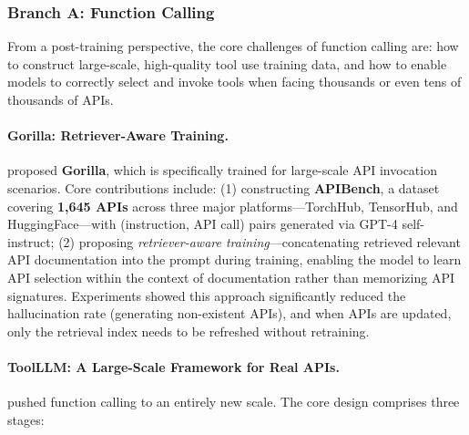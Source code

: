\subsubsection{Branch A: Function Calling}

From a post-training perspective, the core challenges of function calling are: how to construct large-scale, high-quality tool use training data, and how to enable models to correctly select and invoke tools when facing thousands or even tens of thousands of APIs.

\paragraph{Gorilla: Retriever-Aware Training.}
\citet{patil2023gorilla} proposed \textbf{Gorilla}, which is specifically trained for large-scale API invocation scenarios. Core contributions include: (1) constructing \textbf{APIBench}, a dataset covering \textbf{1,645 APIs} across three major platforms---TorchHub, TensorHub, and HuggingFace---with (instruction, API call) pairs generated via GPT-4 self-instruct; (2) proposing \emph{retriever-aware training}---concatenating retrieved relevant API documentation into the prompt during training, enabling the model to learn API selection within the context of documentation rather than memorizing API signatures. Experiments showed this approach significantly reduced the hallucination rate (generating non-existent APIs), and when APIs are updated, only the retrieval index needs to be refreshed without retraining.

\paragraph{ToolLLM: A Large-Scale Framework for Real APIs.}
 pushed function calling to an entirely new scale. The core design comprises three stages:

